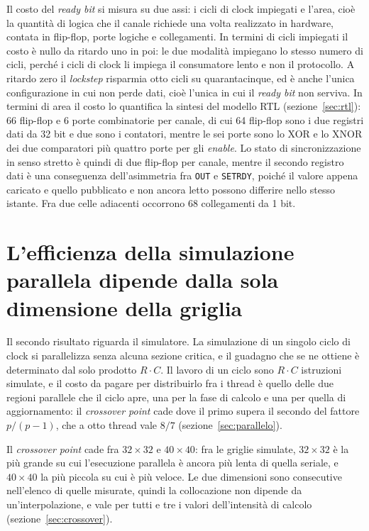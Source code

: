 Il costo del \emph{ready bit} si misura su due assi: i cicli di clock
impiegati e l'area, cioè la quantità di logica che il canale richiede una volta
realizzato in hardware, contata in flip-flop, porte logiche e collegamenti. In
termini di cicli impiegati il costo è nullo da ritardo uno in poi: le due modalità impiegano lo stesso numero di cicli, perché i cicli di clock li impiega il consumatore lento e non il protocollo. A ritardo zero il \emph{lockstep} risparmia otto
cicli su quarantacinque, ed è anche l'unica configurazione in cui non perde
dati, cioè l'unica in cui il \emph{ready bit} non serviva. In termini di area il
costo lo quantifica la sintesi del modello RTL (sezione~\ref{sec:rtl}): 66 flip-flop e 6 porte
combinatorie per canale, di cui 64 flip-flop sono i due registri dati da 32 bit
e due sono i contatori, mentre le sei porte sono lo XOR e lo XNOR dei due
comparatori più quattro porte per gli \emph{enable}. Lo stato di sincronizzazione in senso
stretto è quindi di due flip-flop per canale, mentre il secondo registro dati è
una conseguenza dell'asimmetria fra \texttt{OUT} e \texttt{SETRDY}, poiché il
valore appena caricato e quello pubblicato e non ancora letto possono differire
nello stesso istante. Fra due celle adiacenti occorrono 68 collegamenti da 1 bit.

\section{L'efficienza della simulazione parallela dipende dalla sola dimensione
         della griglia}

Il secondo risultato riguarda il simulatore. La simulazione di un singolo ciclo
di clock si parallelizza senza alcuna sezione critica, e il guadagno che se ne
ottiene è determinato dal solo prodotto $R \cdot C$. Il lavoro di un ciclo sono
$R \cdot C$ istruzioni simulate, e il costo da pagare per distribuirlo fra i
thread è quello delle due regioni parallele che il ciclo apre, una per la fase
di calcolo e una per quella di aggiornamento: il \emph{crossover point} cade
dove il primo supera il secondo del fattore $p/(p-1)$, che a otto thread vale
$8/7$ (sezione~\ref{sec:parallelo}).

Il \emph{crossover point} cade fra $32\times32$ e $40\times40$: fra le griglie simulate,
$32\times32$ è la più grande su cui l'esecuzione parallela è ancora più lenta di
quella seriale, e $40\times40$ la più piccola su cui è più veloce. Le due
dimensioni sono consecutive nell'elenco di quelle misurate, quindi la
collocazione non dipende da un'interpolazione, e vale per tutti e tre i valori
dell'intensità di calcolo (sezione~\ref{sec:crossover}).

